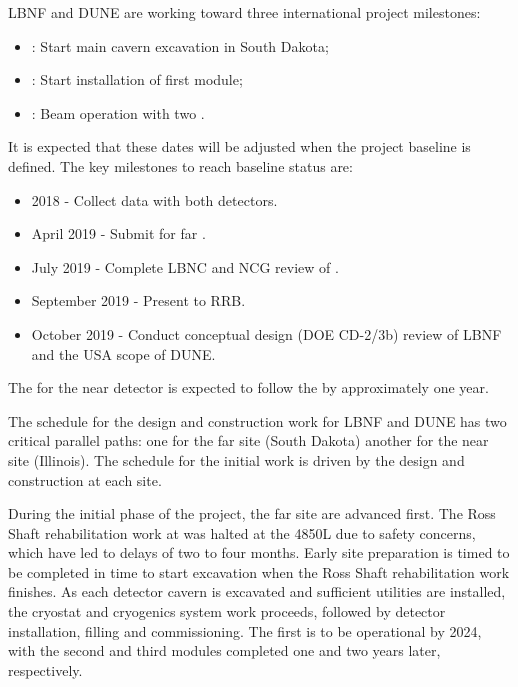 LBNF and DUNE are working toward three international project milestones:
\begin{itemize}
\item \maincavernstartexc{}: Start main cavern excavation in South Dakota; %
\item \firstfdmodstartinstall{}: Start installation of first  module; 
\item \beamturnon{}: Beam operation with two .
\end{itemize}
It is expected that these dates will be adjusted when the project baseline is defined. The key milestones to reach baseline status are:
\begin{itemize}
\item 2018 - Collect data with both  detectors.
\item April 2019 - Submit  for far .
\item July 2019 - Complete LBNC and NCG review of .
\item September 2019 - Present  to RRB.
\item October 2019 - Conduct conceptual design (DOE CD-2/3b) review of LBNF and the USA scope of DUNE.
\end{itemize}
The  for the near detector is expected to follow the   by approximately one year.

The schedule for the design and construction work for LBNF and DUNE has two critical parallel paths: one for the %
far site (South Dakota) %
another for the %
near site (Illinois). %
The schedule for the initial work is driven by the  design and construction at each site.

During the initial phase of the project, the far site  are advanced first. The Ross Shaft rehabilitation
work at \surf was halted at the 4850L due to safety concerns, which have led to delays of two to four months. Early site preparation is timed to be completed 
in time to start excavation when the Ross Shaft rehabilitation work finishes. As each detector 
 cavern is excavated and sufficient utilities are installed, the cryostat and cryogenics system work proceeds, followed by detector installation, filling and commissioning. 
The first  is to be operational by 2024, with the second and third modules completed one and two years later, respectively.

